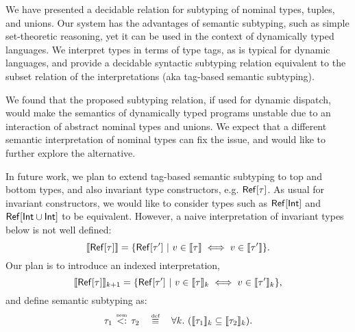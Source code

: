 We have presented a decidable relation for subtyping of
nominal types, tuples, and unions.
Our system has the advantages of semantic subtyping, 
such as simple set-theoretic reasoning, 
yet it can be used in the context of dynamically typed languages.
We interpret types in terms of type tags, 
as is typical for dynamic languages,
and provide a decidable syntactic subtyping relation %
equivalent to the subset relation of the interpretations
(aka tag-based semantic subtyping).

We found that the proposed subtyping relation, 
if used for dynamic dispatch, 
would make the semantics of dynamically typed programs unstable
due to an interaction of abstract nominal types and unions.
We expect that a different semantic interpretation of nominal types 
can fix the issue, and would like to further explore the alternative.

In future work, we plan to extend tag-based semantic subtyping 
to top and bottom types, 
and also invariant type constructors, e.g. $\mathsf{Ref}[\tau]$. %
As usual for invariant constructors, 
we would like to consider types such as $\mathsf{Ref}[\mathsf{Int}]$
and $\mathsf{Ref}[\mathsf{Int} \cup \mathsf{Int}]$ to be equivalent.
However, a naive interpretation of invariant types below
is not well defined:
\[
\llbracket \mathsf{Ref}[\tau] \rrbracket = 
\{ \mathsf{Ref}[\tau'] ~\vert~ v \in \llbracket \tau \rrbracket \iff v \in \llbracket \tau' \rrbracket \}.
\]
Our plan is to introduce an indexed interpretation,
\[
\llbracket \mathsf{Ref}[\tau] \rrbracket_{k+1} = \{ \mathsf{Ref}[\tau'] 
    ~\vert~ v \in \llbracket \tau \rrbracket_k \iff v \in \llbracket \tau' \rrbracket_k \},
\]
and define semantic subtyping as:
\[
\bjtruesemsub{\ty_1}{\ty_2} \quad \defsign \quad
\forall k.\ (\interpty{\ty_1}_k \subseteq \interpty{\ty_2}_k).
\]

